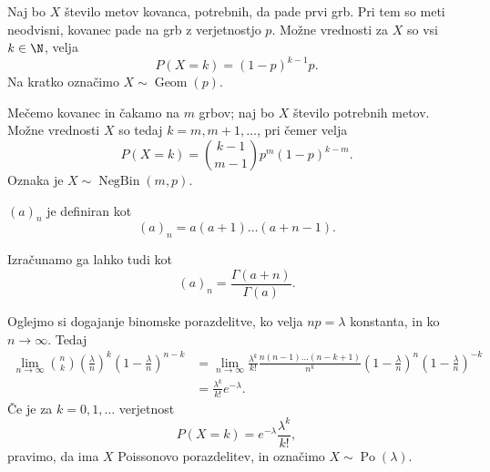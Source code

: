 
\begin{primer}
  Naj bo $X$ število metov kovanca, potrebnih, da pade prvi grb.
  Pri tem so meti neodvisni, kovanec pade na grb z verjetnostjo $p$.
  Možne vrednosti za $X$ so vsi $k \in \N$, velja
  \[
	P(X = k) = (1-p)^{k-1} p.
  \]
  Na kratko označimo $X \sim \operatorname{Geom}(p)$.
\end{primer}


\begin{primer}
  Mečemo kovanec in čakamo na $m$ grbov; naj bo $X$ število potrebnih metov.
  Možne vrednosti $X$ so tedaj $k = m, m+1, \ldots$, pri čemer velja
  \[
	P(X=k) = \binom{k-1}{m-1} p^m (1-p)^{k-m}.
  \]
  Oznaka je $X \sim \operatorname{NegBin}(m, p)$.
\end{primer}


\begin{definicija}
   $(a)_n$ je definiran kot
  \[
	(a)_n = a (a+1) \ldots (a+n-1).
  \]
\end{definicija}

\begin{opomba}
  Izračunamo ga lahko tudi kot
  \[
	(a)_n = \frac{\Gamma(a+n)}{\Gamma(a)}.
  \]
\end{opomba}

\begin{primer}
  Oglejmo si dogajanje binomske porazdelitve, ko velja $np = \lambda$ konstanta,
  in ko $n \to \infty$.
  Tedaj
  \begin{align*}
	\lim_{n \to \infty} \binom{n}{k} \left( \frac{\lambda}{n} \right)^k
	\left( 1 - \frac{\lambda}{n} \right)^{n-k}
	&= \lim_{n \to \infty} \frac{\lambda^k}{k!} \frac{n(n-1) \ldots (n-k+1)}{n^k}
	\left( 1 - \frac{\lambda}{n} \right)^n \left( 1 - \frac{\lambda}{n}
	\right)^{-k} \\
	&= \frac{\lambda^k}{k!} e^{-\lambda}.
  \end{align*}
  Če je za $k = 0, 1, \ldots$ verjetnost
  \[
	P(X = k) = e^{-\lambda} \frac{\lambda^k}{k!},
  \]
  pravimo, da ima $X$ Poissonovo porazdelitev, in označimo $X \sim
  \operatorname{Po}(\lambda)$.
\end{primer}


